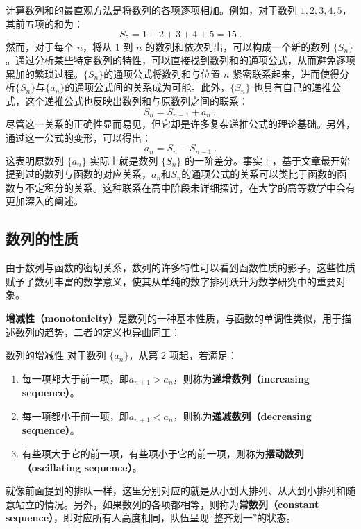 计算数列和的最直观方法是将数列的各项逐项相加。例如，对于数列 $1, 2, 3, 4, 5$，其前五项的和为：
$$
S_5 = 1 + 2 + 3 + 4 + 5 = 15~.
$$
然而，对于每个 $n$，将从 $1$ 到 $n$ 的数列和依次列出，可以构成一个新的数列 $\{S_n\}$。通过分析某些特定数列的特性，可以直接找到数列和的通项公式，从而避免逐项累加的繁琐过程。$\{S_n\}$的通项公式将数列和与位置 $n$ 紧密联系起来，进而使得分析$\{S_n\}$与$\{a_n\}$的通项公式间的关系成为可能。此外，$\{S_n\}$ 也具有自己的递推公式，这个递推公式也反映出数列和与原数列之间的联系：
\begin{equation}
S_n = S_{n-1} + a_n~,
\end{equation}
尽管这一关系的正确性显而易见，但它却是许多复杂递推公式的理论基础。另外，通过这一公式的变形，可以得出：
\begin{equation}
a_n = S_n - S_{n-1}~.
\end{equation}
这表明原数列 $\{a_n\}$ 实际上就是数列 $\{S_n\}$ 的一阶差分。事实上，基于文章最开始提到过的数列与函数的对应关系，$a_n$和$S_n$的通项公式的关系可以类比于函数的函数与不定积分的关系。这种联系在高中阶段未详细探讨，在大学的高等数学中会有更加深入的阐述。

\subsection{数列的性质}

由于数列与函数的密切关系，数列的许多特性可以看到函数性质的影子。这些性质赋予了数列丰富的数学意义，使其从单纯的数字排列跃升为数学研究中的重要对象。

\textbf{增减性（monotonicity）}是数列的一种基本性质，与函数的单调性类似，用于描述数列的趋势，二者的定义也异曲同工：

\begin{definition}{数列的增减性}
对于数列 $\{a_n\}$，从第 $2$ 项起，若满足：
\begin{enumerate}
\item 每一项都大于前一项，即$a_{n+1} > a_n$，则称为\textbf{递增数列（increasing sequence）}。
\item 每一项都小于前一项，即$a_{n+1} < a_n$，则称为\textbf{递减数列（decreasing sequence）}。
\item 有些项大于它的前一项，有些项小于它的前一项，则称为\textbf{摆动数列（oscillating sequence）}。
\end{enumerate}
\end{definition}

就像前面提到的排队一样，这里分别对应的就是从小到大排列、从大到小排列和随意站立的情况。另外，如果数列的各项都相等，则称为\textbf{常数列（constant sequence）}，即对应所有人高度相同，队伍呈现“整齐划一”的状态。

